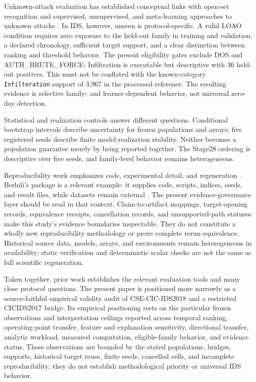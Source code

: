 \documentclass[preprint,12pt]{elsarticle}
\begin{document}
Unknown-attack evaluation has established conceptual links with open-set recognition and supervised, unsupervised, and meta-learning approaches to unknown attacks \cite{scheirer2013openset,zoppi2023unknown,shin2023openset}. In IDS, however, unseen is protocol-specific. A valid LOAO condition requires zero exposure to the held-out family in training and validation, a declared chronology, sufficient target support, and a clear distinction between ranking and threshold behavior. The present eligibility gates exclude DOS and AUTH\_BRUTE\_FORCE; Infiltration is executable but descriptive with 36 held-out positives. This must not be conflated with the known-category \texttt{Infilteration} support of 3,967 in the processed reference. The resulting evidence is selective family- and learner-dependent behavior, not universal zero-day detection.

Statistical and realization controls answer different questions. Conditional bootstrap intervals describe uncertainty for frozen populations and arrays; five registered seeds describe finite model-realization stability. Neither becomes a population guarantee merely by being reported together. The Stage28 ordering is descriptive over five seeds, and family-level behavior remains heterogeneous.

Reproducibility work emphasizes code, experimental detail, and regeneration \cite{pineau2021reproducibility}. Berhili's package is a relevant example: it supplies code, scripts, indices, seeds, and result files, while datasets remain external \cite{berhili2026reproducibility}. The present evidence-governance layer should be read in that context. Claim-to-artifact mappings, target-opening records, equivalence receipts, cancellation records, and unsupported-path statuses make this study's evidence boundaries inspectable. They do not constitute a wholly new reproducibility methodology or prove complete rerun equivalence. Historical source data, models, arrays, and environments remain heterogeneous in availability; static verification and deterministic scalar checks are not the same as full scientific regeneration.

Taken together, prior work establishes the relevant evaluation tools and many close protocol questions. The present paper is positioned more narrowly as a source-faithful empirical validity audit of CSE-CIC-IDS2018 and a restricted CICIDS2017 bridge. Its empirical positioning rests on the particular frozen observations and interpretation ceilings reported across temporal ranking, operating-point transfer, feature and explanation sensitivity, directional transfer, analytic workload, measured computation, eligible-family behavior, and evidence status. These observations are bounded by the stated populations, bridges, supports, historical target reuse, finite seeds, cancelled cells, and incomplete reproducibility; they do not establish methodological priority or universal IDS behavior.
\end{document}
